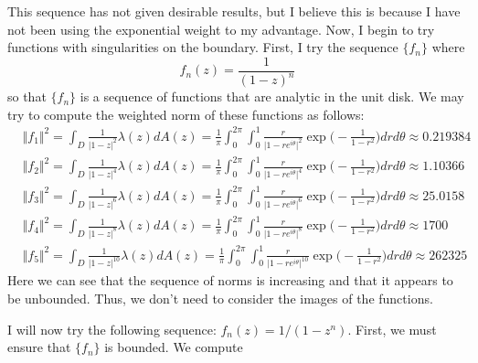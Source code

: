 \documentclass[12pt]{article}
\begin{document}
\par This sequence has not given desirable results, but I believe this is because I have not been using the exponential weight to my advantage. Now, I begin to try functions with singularities on the boundary. First, I try the sequence $\{f_n\}$ where
\[
f_n(z) = \frac{1}{(1-z)^n}
\] so that $\{f_n\}$ is a sequence of functions that are analytic in the unit disk. We may try to compute the weighted norm of these functions as follows:
\begin{align*}
&\Vert f_1 \Vert^2 = \int_D \frac{1}{\vert 1 - z \vert^2} \lambda(z) dA(z) = \frac{1}{\pi} \int_0^{2\pi} \int_0^1 \frac{r}{\vert 1 - re^{i\theta} \vert^2} \exp\bigg(-\frac{1}{1-r^2}\bigg) dr d\theta \approx 0.219384 \\
&\Vert f_2 \Vert^2 = \int_D \frac{1}{\vert 1 - z \vert^4} \lambda(z) dA(z) = \frac{1}{\pi}\int_0^{2\pi} \int_0^1 \frac{r}{\vert 1 - re^{i\theta} \vert^4} \exp\bigg(-\frac{1}{1-r^2}\bigg) dr d\theta \approx 1.10366 \\
&\Vert f_3 \Vert^2 = \int_D \frac{1}{\vert 1 - z \vert^6} \lambda(z) dA(z) = \frac{1}{\pi}\int_0^{2\pi} \int_0^1 \frac{r}{\vert 1 - re^{i\theta} \vert^6} \exp\bigg(-\frac{1}{1-r^2}\bigg) dr d\theta \approx 25.0158 \\
&\Vert f_4 \Vert^2 = \int_D \frac{1}{\vert 1 - z \vert^{8}} \lambda(z) dA(z) = \frac{1}{\pi}\int_0^{2\pi} \int_0^1 \frac{r}{\vert 1 - re^{i\theta} \vert^{8}} \exp\bigg(-\frac{1}{1-r^2}\bigg) dr d\theta \approx 1700 \\
&\Vert f_5 \Vert^2 = \int_D \frac{1}{\vert 1 - z \vert^{10}} \lambda(z) dA(z) = \frac{1}{\pi} \int_0^{2\pi} \int_0^1 \frac{r}{\vert 1 - re^{i\theta} \vert^{10}} \exp\bigg(-\frac{1}{1-r^2}\bigg) dr d\theta \approx 262325
\end{align*} Here we can see that the sequence of norms is increasing and that it appears to be unbounded. Thus, we don't need to consider the images of the functions. 
\par I will now try the following sequence: $f_n(z) = 1/(1-z^n)$. First, we must ensure that $\{f_n\}$ is bounded. We compute
\end{document}

